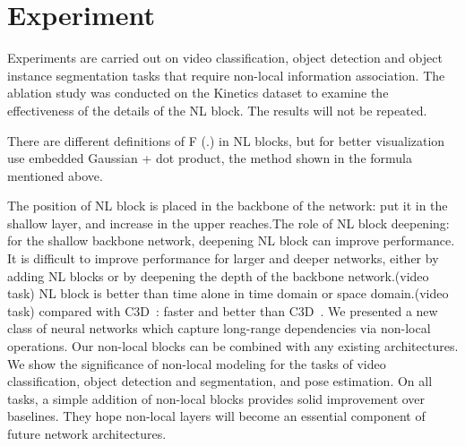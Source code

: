 \documentclass[10pt,twocolumn,letterpaper]{article}
\begin{document}
\section{Experiment}
Experiments are carried out on video classification, object detection and object instance segmentation tasks that require non-local information association. The ablation study was conducted on the Kinetics dataset to examine the effectiveness of the details of the NL block. The results will not be repeated. \cite{name28}
\par There are different definitions of F (.) in NL blocks, but for better visualization use embedded Gaussian + dot product, the method shown in the formula mentioned above.
\par The position of NL block is placed in the backbone of the network: put it in the shallow layer, and increase in the upper reaches.The role of NL block deepening: for the shallow backbone network, deepening NL block can improve performance. It is difficult to improve performance for larger and deeper networks, either by adding NL blocks or by deepening the depth of the backbone network.(video task) NL block is better than time alone in time domain or space domain.(video task) compared with C3D~\cite{name13}: faster and better than C3D~\cite{name33}. We presented a new class of neural networks which capture long-range dependencies via non-local operations. Our non-local blocks can be combined with any existing architectures. We show the significance of non-local modeling for the tasks of video classification, object detection and segmentation, and pose estimation. On all tasks, a simple addition of non-local blocks provides solid improvement over baselines. They hope non-local layers will become an essential component of future network architectures.


\end{document}
